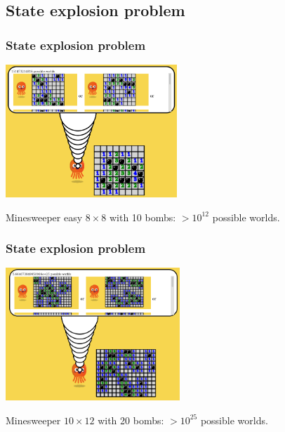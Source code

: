 
\subsection{State explosion problem}

\begin{frame}
\frametitle{State explosion problem}




\begin{center}
	\includegraphics[height=5cm]{images/HW_minesweeper_easy.png}
\end{center}


\begin{example}
	Minesweeper easy $8 \times 8$ with 10 bombs: $> 10^{12}$ possible worlds.
\end{example}
\end{frame}

\begin{frame}
\frametitle{State explosion problem}




\begin{center}
	\includegraphics[height=5cm]{images/hintikkas_world_minesweeper.png}
\end{center}


\begin{example}
	Minesweeper $10 \times 12$ with 20 bombs: $> 10^{25}$ possible worlds.
\end{example}
\end{frame}


